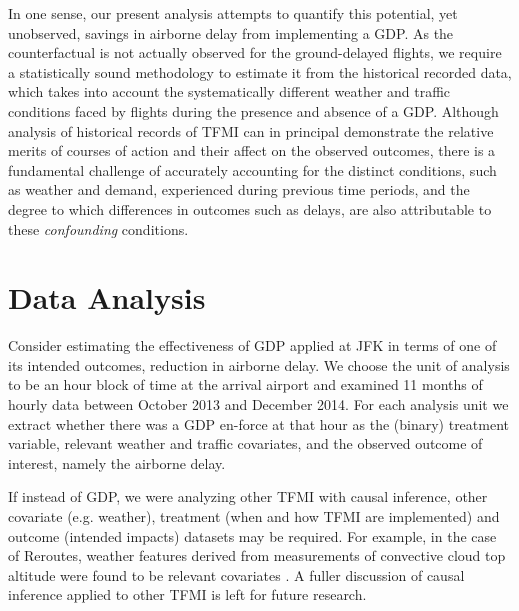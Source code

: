 \documentclass[conference]{IEEEtran}
\begin{document}
In one sense, our present analysis attempts to quantify this potential, yet unobserved, savings in airborne delay from implementing a GDP.  As the counterfactual is not actually observed for the ground-delayed flights, we require a statistically sound methodology to estimate it from the historical recorded data, which takes into account the systematically different weather and traffic conditions faced by flights during the presence and absence of a GDP.  Although analysis of historical records of TFMI can in principal demonstrate the relative merits of courses of action and their affect on the observed outcomes, there is a fundamental challenge of accurately accounting for the distinct conditions, such as weather and demand, experienced during previous time periods, and the degree to which differences in outcomes such as delays, are also attributable to these \emph{confounding} conditions.  
 

\section{Data Analysis}
Consider estimating the effectiveness of GDP applied at JFK in terms of one of its intended outcomes, reduction in airborne delay.  We choose the unit of analysis to be an hour block of time at the arrival airport and examined 11 months of hourly data between October 2013 and December 2014.  For each analysis unit we extract whether there was a GDP en-force at that hour as the (binary) treatment variable, relevant weather and traffic covariates, and the observed outcome of interest, namely the airborne delay. 

If instead of GDP, we were analyzing other TFMI with causal inference, other covariate (e.g. weather), treatment (when and how TFMI are implemented) and outcome (intended impacts) datasets may be required.  For example, in the case of Reroutes, weather features derived from measurements of convective cloud top altitude were found to be relevant covariates \cite{arneson2015initial}.  A fuller discussion of causal inference applied to other TFMI is left for future research.
\end{document}
